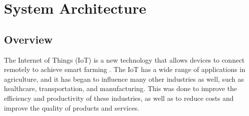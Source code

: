 \chapter{System Architecture}\label{section:overview}

\section{Overview}
The Internet of Things (IoT) is a new technology that allows devices to connect remotely to achieve smart
farming \cite{agriculture12101745}. The IoT has a wide range of applications in agriculture, and it has 
began to influence many other industries as well, such as healthcare, transportation, and manufacturing. 
This was done to improve the efficiency and productivity of these industries, 
as well as to reduce costs and improve the quality of products and services\cite{s19081833}.

